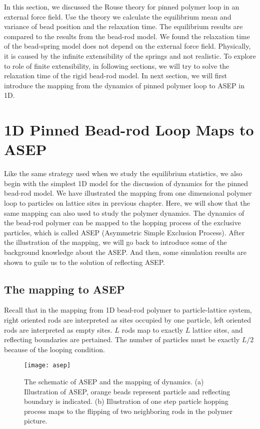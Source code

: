 In this section, we discussed the Rouse theory for pinned polymer loop in an external force field. Use the theory we calculate the equilibrium mean and variance of bead position and the relaxation time. The equilibrium results are compared to the results from the bead-rod model. We found the relaxation time of the bead-spring model does not depend on the external force field. Physically, it is caused by the infinite extensibility of the springs and not realistic. To explore to role of finite extensibility, in following sections, we will try to solve the relaxation time of the rigid bead-rod model. In next section, we will first introduce the mapping from the dynamics of pinned polymer loop to ASEP in 1D. 


\section{1D Pinned Bead-rod Loop Maps to ASEP}
\label{sec:1d_pinned_bead_rod_loop_maps_to_asep}
Like the same strategy used when we study the equilibrium statistics, we also begin with the simplest 1D model for the discussion of dynamics for the pinned bead-rod model. We have illustrated the mapping from one dimensional polymer loop to particles on lattice sites in previous chapter. Here, we will show that the same mapping can also used to study the polymer dynamics. The dynamics of the bead-rod polymer can be mapped to the hopping process of the exclusive particles, which is called ASEP (Asymmetric Simple Exclusion Process). After the illustration of the mapping, we will go back to introduce some of the background knowledge about the ASEP. And then, some simulation results are shown to guile us to the solution of reflecting ASEP.

\subsection{The mapping to ASEP}
\label{sub:the_mapping_to_asep}
Recall that in the mapping from 1D bead-rod polymer to particle-lattice system, right oriented rods are interpreted as sites occupied by one particle, left oriented rods are interpreted as empty sites. $L$ rods map to exactly $L$ lattice sites, and reflecting boundaries are pertained. The number of particles must be exactly $L/2$ because of the looping condition. 

\begin{figure}[htpb]
    \centering
    \texttt{[image: asep]}
    \caption{The schematic of ASEP and the mapping of dynamics. (a) Illustration of ASEP, orange beads represent particle and reflecting boundary is indicated. (b) Illustration of one step particle hopping process maps to the flipping of two neighboring rods in the polymer picture. }
    \label{fig:asep}
\end{figure}

